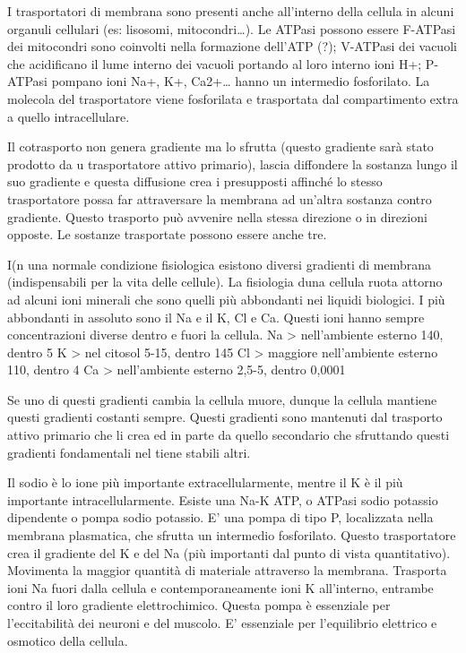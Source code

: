\documentclass[]{article}
\begin{document}
I trasportatori di membrana sono presenti anche all'interno della
cellula in alcuni organuli cellulari (es: lisosomi, mitocondri\ldots{}).
Le ATPasi possono essere F-ATPasi dei mitocondri sono coinvolti nella
formazione dell'ATP (?); V-ATPasi dei vacuoli che acidificano il lume
interno dei vacuoli portando al loro interno ioni H+; P-ATPasi pompano
ioni Na+, K+, Ca2+\ldots{} hanno un intermedio fosforilato. La molecola
del trasportatore viene fosforilata e trasportata dal compartimento
extra a quello intracellulare.

Il cotrasporto non genera gradiente ma lo sfrutta (questo gradiente sarà
stato prodotto da u trasportatore attivo primario), lascia diffondere la
sostanza lungo il suo gradiente e questa diffusione crea i presupposti
affinché lo stesso trasportatore possa far attraversare la membrana ad
un'altra sostanza contro gradiente. Questo trasporto può avvenire nella
stessa direzione o in direzioni opposte. Le sostanze trasportate possono
essere anche tre.

I(n una normale condizione fisiologica esistono diversi gradienti di
membrana (indispensabili per la vita delle cellule). La fisiologia duna
cellula ruota attorno ad alcuni ioni minerali che sono quelli più
abbondanti nei liquidi biologici. I più abbondanti in assoluto sono il
Na e il K, Cl e Ca. Questi ioni hanno sempre concentrazioni diverse
dentro e fuori la cellula. Na \textgreater{} nell'ambiente esterno 140,
dentro 5 K \textgreater{} nel citosol 5-15, dentro 145 Cl \textgreater{}
maggiore nell'ambiente esterno 110, dentro 4 Ca \textgreater{}
nell'ambiente esterno 2,5-5, dentro 0,0001

Se uno di questi gradienti cambia la cellula muore, dunque la cellula
mantiene questi gradienti costanti sempre. Questi gradienti sono
mantenuti dal trasporto attivo primario che li crea ed in parte da
quello secondario che sfruttando questi gradienti fondamentali nel tiene
stabili altri.

Il sodio è lo ione più importante extracellularmente, mentre il K è il
più importante intracellularmente. Esiste una Na-K ATP, o ATPasi sodio
potassio dipendente o pompa sodio potassio. E' una pompa di tipo P,
localizzata nella membrana plasmatica, che sfrutta un intermedio
fosforilato. Questo trasportatore crea il gradiente del K e del Na (più
importanti dal punto di vista quantitativo). Movimenta la maggior
quantità di materiale attraverso la membrana. Trasporta ioni Na fuori
dalla cellula e contemporaneamente ioni K all'interno, entrambe contro
il loro gradiente elettrochimico. Questa pompa è essenziale per
l'eccitabilità dei neuroni e del muscolo. E' essenziale per l'equilibrio
elettrico e osmotico della cellula.
\end{document}
